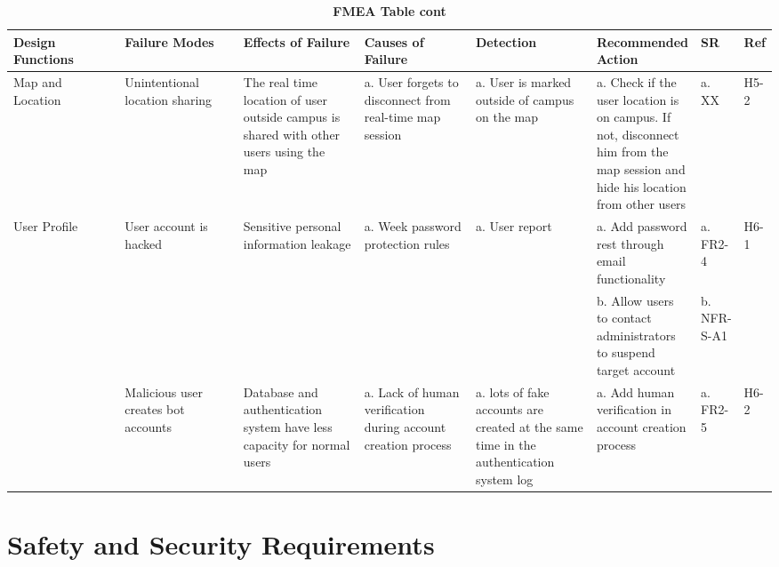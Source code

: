 \documentclass{article}
\begin{document}
\begin{table}[H]
    \begin{adjustbox}{width=(/5)}
    \centering
    

    \begin{tabular}{|p{0.20\linewidth} | p{0.20\linewidth} | p{0.20\linewidth}|  p{0.20\linewidth}|  p{0.21\linewidth}|  p{0.30\linewidth}|  p{0.08\linewidth}|p{0.07\linewidth}| }
    \hline
         \textbf{Design Functions} & \textbf{Failure Modes} & \textbf{Effects of Failure} & \textbf{Causes of Failure} &\textbf{Detection}& \textbf{Recommended Action} & \textbf{SR} & \textbf{Ref}\\
         \hline
         Map and Location     &     Unintentional location sharing      &      The real time location of user outside campus is shared with other users using the map      &      a. User forgets to disconnect from real-time map session      &      a. User is marked outside of campus on the map     &      a. Check if the user location is on campus. If not, disconnect him from the map session and hide his location from other users      &      a. XX      &      H5-2      \\
         \hline
         User Profile     &    User account is hacked      &      Sensitive personal information leakage      &      a. Week password protection rules      &      a. User report      &      a. Add password rest through email functionality      &      a. FR2-4      &      H6-1      \\
         &&&&&      b. Allow users to contact administrators to suspend target account      &      b. NFR-S-A1      & \\
         &      Malicious user creates bot accounts      &       Database and authentication system have less capacity for normal users    &      a. Lack of human verification during account creation process      &      a. lots of fake accounts are created at the same time in the authentication system log      &      a. Add human verification in account creation process    &      a. FR2-5      &      H6-2     \\
          \hline
    \end{tabular}
    \end{adjustbox}
    \caption{\bf FMEA Table cont}
    \label{tab:FMEA2}
\end{table}

\section{Safety and Security Requirements}
\end{document}

